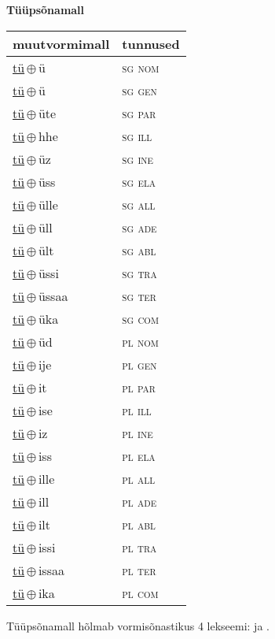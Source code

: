 

\vspace{3.5em}
\noindent \begin{minipage}{\textwidth}
\noindent \textbf{Tüüpsõnamall \,}\\

\begin{sideways}
\begin{tabular}{l l}
muutvormimall & tunnused \\
\hline
\underline{tü}\,$\oplus$\,ü & \textsc{ sg nom } \\
\underline{tü}\,$\oplus$\,ü & \textsc{ sg gen } \\
\underline{tü}\,$\oplus$\,üte & \textsc{ sg par } \\
\underline{tü}\,$\oplus$\,hhe & \textsc{ sg ill } \\
\underline{tü}\,$\oplus$\,üz & \textsc{ sg ine } \\
\underline{tü}\,$\oplus$\,üss & \textsc{ sg ela } \\
\underline{tü}\,$\oplus$\,ülle & \textsc{ sg all } \\
\underline{tü}\,$\oplus$\,üll & \textsc{ sg ade } \\
\underline{tü}\,$\oplus$\,ült & \textsc{ sg abl } \\
\underline{tü}\,$\oplus$\,üssi & \textsc{ sg tra } \\
\underline{tü}\,$\oplus$\,üssaa & \textsc{ sg ter } \\
\underline{tü}\,$\oplus$\,üka & \textsc{ sg com } \\
\underline{tü}\,$\oplus$\,üd & \textsc{ pl nom } \\
\underline{tü}\,$\oplus$\,ije & \textsc{ pl gen } \\
\underline{tü}\,$\oplus$\,it & \textsc{ pl par } \\
\underline{tü}\,$\oplus$\,ise & \textsc{ pl ill } \\
\underline{tü}\,$\oplus$\,iz & \textsc{ pl ine } \\
\underline{tü}\,$\oplus$\,iss & \textsc{ pl ela } \\
\underline{tü}\,$\oplus$\,ille & \textsc{ pl all } \\
\underline{tü}\,$\oplus$\,ill & \textsc{ pl ade } \\
\underline{tü}\,$\oplus$\,ilt & \textsc{ pl abl } \\
\underline{tü}\,$\oplus$\,issi & \textsc{ pl tra } \\
\underline{tü}\,$\oplus$\,issaa & \textsc{ pl ter } \\
\underline{tü}\,$\oplus$\,ika & \textsc{ pl com } \\
\end{tabular}
\end{sideways}
\label{tab:tüüpsõnamall-tüü}

\end{minipage}

 
\vspace{1em}
\noindent Tüüpsõnamall  hõlmab vormisõnastikus 4 lekseemi:  ja .
